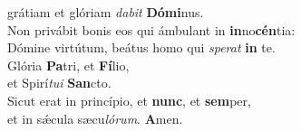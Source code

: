 \evenverse grátiam et glóriam \textit{da}\textit{bit} \textbf{Dó}\textbf{mi}nus.\\
\oddverse Non privábit bonis eos qui ámbulant in \textbf{in}no\textbf{cén}tia:~\*\\
\oddverse Dómine virtútum, beátus homo qui \textit{spe}\textit{rat} \textbf{in} te.\\
\evenverse Glória \textbf{Pa}tri, et \textbf{Fí}lio,~\*\\
\evenverse et Spirí\textit{tu}\textit{i} \textbf{San}cto.\\
\oddverse Sicut erat in princípio, et \textbf{nunc}, et \textbf{sem}per,~\*\\
\oddverse et in sǽcula sæcu\textit{ló}\textit{rum}. \textbf{A}men.\\
